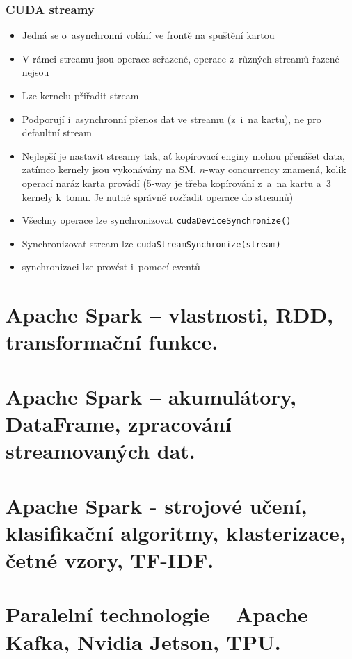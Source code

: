 \subsubsection{CUDA streamy}
\begin{itemize}
    \item Jedná se o~asynchronní volání ve frontě na spuštění kartou
    \item V rámci streamu jsou operace seřazené, operace z~různých streamů řazené nejsou
    \item Lze kernelu přiřadit stream
    \item Podporují i~asynchronní přenos dat ve streamu (z~i~na kartu), ne pro defaultní stream
    \item Nejlepší je nastavit streamy tak, ať kopírovací enginy mohou přenášet data, zatímco kernely jsou vykonávány na SM. \(n\)-way concurrency znamená, kolik operací naráz karta provádí (5-way je třeba kopírování z~a~na kartu a~3 kernely k~tomu. Je nutné správně rozřadit operace do streamů)
    \item Všechny operace lze synchronizovat \texttt{cudaDeviceSynchronize()}
    \item Synchronizovat stream lze \texttt{cudaStreamSynchronize(stream)}
    \item synchronizaci lze provést i~pomocí eventů
\end{itemize}



\section{Apache Spark – vlastnosti, RDD, transformační funkce.}
\section{Apache Spark – akumulátory, DataFrame, zpracování streamovaných dat.}
\section{Apache Spark - strojové učení, klasifikační algoritmy, klasterizace, četné vzory, TF-IDF.}
\section{Paralelní technologie – Apache Kafka, Nvidia Jetson, TPU.}